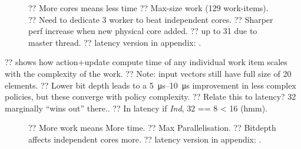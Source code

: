 \documentclass[sigconf,natbib=false]{acmart}
\newcommand{\Indfw}{\emph{Ind}}
\begin{document}
\begin{figure}
	\caption{?? More cores means less time ?? Max-size work (129 work-items). ?? Need to dedicate 3 worker to beat independent cores. ?? Sharper perf increase when new physical core added. ?? up to 31 due to master thread. ?? latency version in appendix: .\label{fig:vary-core}}
\end{figure}

??  shows how action+update compute time of any individual work item scales with the complexity of the work.
?? Note: input vectors still have full size of 20 elements.
?? Lower bit depth leads to a \SIrange{5}{10}{\micro\second} improvement in less complex policies, but these converge with policy complexity.
?? Relate this to latency? \SI{32}{\bit} marginally ``wins out'' there..
?? In latency if \Indfw{}, 32 == 8 < 16 (hmm).

\begin{figure}
	\caption{?? More work means More time. ?? Max Parallelisation. ?? Bitdepth affects independent cores more. ?? latency version in appendix: .\label{fig:vary-work}}
\end{figure}
\end{document}
